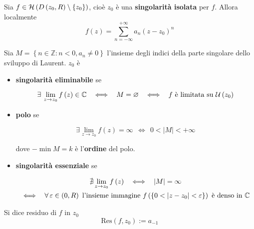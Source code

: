\Soluzione
\begin{thm}
Sia $f\in \mathcal{H} \left( D\left( z_{0} ,R\right) \setminus \left\{z_{0}\right\}\right)$, cioè $z_{0}$ è una \textbf{singolarità isolata} per $f$. Allora localmente
\begin{equation*}
f\left( z\right) =\sum\limits ^{+\infty }_{n=-\infty } a_{n}\left( z-z_{0}\right)^{n}
\end{equation*}
\end{thm}
\begin{thm}
Sia $M=\left\{n\in \mathbb{Z} :n< 0,a_{n} \neq 0\right\}$ l'insieme degli indici della parte singolare dello sviluppo di Laurent. $z_{0}$ è

\begin{itemize}
\item \textbf{singolarità eliminabile} se

\begin{equation*}
\exists \lim\limits _{z\rightarrow z_{0}} f\left( z\right) \in \CC  \ \ \iff \ \ M=\emptyset \ \ \iff \ \ f\ \text{è limitata su} \ \Uc \left( z_{0}\right)
\end{equation*}
\item \textbf{polo} se

\begin{equation*}
\exists \lim\limits _{z\rightarrow z_{0}} f\left( z\right) =\infty \ \ \iff \ \ 0< \left| M\right| < +\infty 
\end{equation*}

dove $-\min M=k$ è l'\textbf{ordine} del polo.
\item \textbf{singolarità essenziale} se

\begin{gather*}
\nexists \lim\limits _{z\rightarrow z_{0}} f\left( z\right) \ \ \iff \ \ \left| M\right| =\infty \\
\iff \ \ \forall \varepsilon \in \left( 0,R\right) \ \text{l'insieme immagine} \ f\left(\left\{0< \left| z-z_{0}\right| < \varepsilon \right\}\right) \ \text{è denso in} \ \CC 
\end{gather*}
\end{itemize}
\end{thm}
\begin{defn}
Si dice residuo di $f$ in $z_{0}$
\begin{equation*}
\mathrm{Res}\left( f,z_{0}\right) :=a_{-1}
\end{equation*}
\end{defn}
